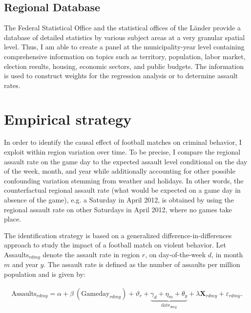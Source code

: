 \subsection{Regional Database}
The Federal Statistical Office and the statistical offices of the Länder provide a database of detailed statistics by various subject areas at a very granular spatial level. Thus, I am able to create a panel at the municipality-year level containing comprehensive information on topics such as territory, population, labor market, election results, housing, economic sectors, and public budgets. The information is used to construct weights for the regression analysis or to determine assault rates. 







\bigskip
\section{Empirical strategy}\label{sec_soc_ext:empirical_strategy}

In order to identify the causal effect of football matches on criminal behavior, I exploit within region variation over time. To be precise, I compare the regional assault rate on the game day to the expected assault level conditional on the day of the week, month, and year while additionally accounting for other possible confounding variation stemming from weather and holidays. In other words, the counterfactual regional assault rate (what would be expected on a game day in absence of the game), e.g. a Saturday in April 2012, is obtained by using the regional assault rate on other Saturdays in April 2012, where no games take place. %


The identification strategy is based on a generalized difference-in-differences approach to study the impact of a football match on violent behavior. Let Assaults$_{rdmy}$ denote the assault rate in region $r$, on day-of-the-week $d$, in month $m$ and year $y$. The assault rate is defined as the number of assaults per million population and is given by:

\begin{align}
\text{Assaults}_{rdmy} = \alpha + \beta\ (\text{Gameday}_{rdmy}) + \vartheta_r + \underbrace{\gamma_d + \eta_m + \theta_y}_{\text{date}_{dmy}} + \lambda \mathbf{X}_{rdmy} + \varepsilon_{rdmy}
\label{eq_soc_ext:model}.
\end{align}

